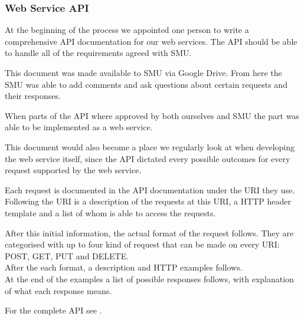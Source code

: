 \subsubsection{Web Service API}
At the beginning of the process we appointed one person to write a comprehensive API documentation for our web services.
The API should be able to handle all of the requirements agreed with SMU.

This document was made available to SMU via Google Drive. From here the SMU was able to add comments and ask questions about certain requests and their responses.

When parts of the API where approved by both ourselves and SMU the part was able to be implemented as a web service.

This document would also become a place we regularly look at when developing the web service itself, since the API dictated every possible outcomes for every request supported by the web service.

Each request is documented in the API documentation under the URI they use. Following the URI is a description of the requests at this URI, a HTTP header template and a list of whom is able to access the requests.

After this initial information, the actual format of the request follows. They are categorised with up to four kind of request that can be made on every URI: POST, GET, PUT and DELETE. \\
After the each format, a description and HTTP examples follows. \\
At the end of the examples a list of possible responses follows, with explanation of what each response means.

For the complete API see .